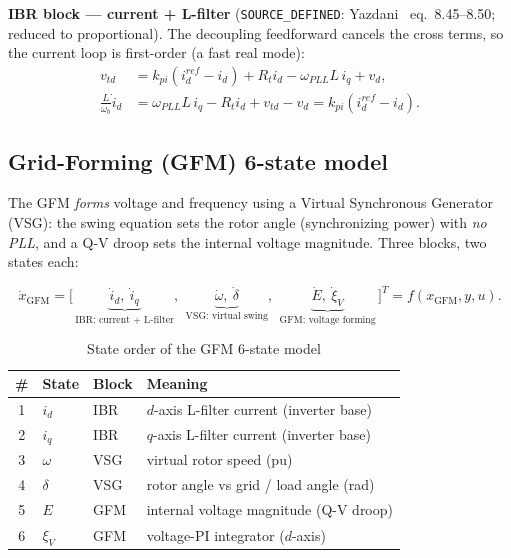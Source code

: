 \documentclass[12pt,a4paper]{article}
\begin{document}
\noindent\textbf{IBR block --- current + L-filter} (\texttt{SOURCE\_DEFINED}:
Yazdani~\cite{yazdani2010} eq.~8.45--8.50; reduced to proportional). The decoupling
feedforward cancels the cross terms, so the current loop is first-order (a fast real
mode):
\begin{align}
v_{td} &= k_{pi}(i_d^{ref}-i_d)+R_t i_d-\omega_{PLL}L\,i_q+v_d,\\
\tfrac{L}{\omega_b}\dot i_d &= \omega_{PLL}L\,i_q-R_t i_d+v_{td}-v_d
= k_{pi}(i_d^{ref}-i_d).
\end{align}

\subsection{Grid-Forming (GFM) 6-state model}
\label{subsec:gfm}

The GFM \emph{forms} voltage and frequency using a Virtual Synchronous Generator (VSG):
the swing equation sets the rotor angle (synchronizing power) with \emph{no PLL}, and a
Q-V droop sets the internal voltage magnitude. Three blocks, two states each:

\begin{equation}
\dot x_{\text{GFM}} =\Big[\,
\underbrace{\dot i_d,\ \dot i_q}_{\text{IBR: current + L-filter}},\ \,
\underbrace{\dot\omega,\ \dot\delta}_{\text{VSG: virtual swing}},\ \,
\underbrace{\dot E,\ \dot\xi_{V}}_{\text{GFM: voltage forming}}
\,\Big]^{T}= f(x_{\text{GFM}},y,u).
\label{eq:gfm-order}
\end{equation}

\begin{table}[H]\centering\small
\caption{State order of the GFM 6-state model}
\label{tab:order-gfm}
\begin{tabular}{clll}\toprule
\# & State & Block & Meaning\\\midrule
1 & $i_d$    & IBR & $d$-axis L-filter current (inverter base)\\
2 & $i_q$    & IBR & $q$-axis L-filter current (inverter base)\\
3 & $\omega$ & VSG & virtual rotor speed (pu)\\
4 & $\delta$ & VSG & rotor angle vs grid / load angle (rad)\\
5 & $E$      & GFM & internal voltage magnitude (Q-V droop)\\
6 & $\xi_{V}$& GFM & voltage-PI integrator ($d$-axis)\\\bottomrule
\end{tabular}\end{table}
\end{document}
